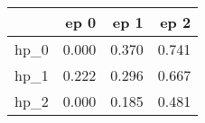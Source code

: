 \begin{tabular}{lrrr}
\toprule
{} &   ep 0 &   ep 1 &   ep 2 \\
\midrule
hp\_0 &  0.000 &  0.370 &  0.741 \\
hp\_1 &  0.222 &  0.296 &  0.667 \\
hp\_2 &  0.000 &  0.185 &  0.481 \\
\bottomrule
\end{tabular}
